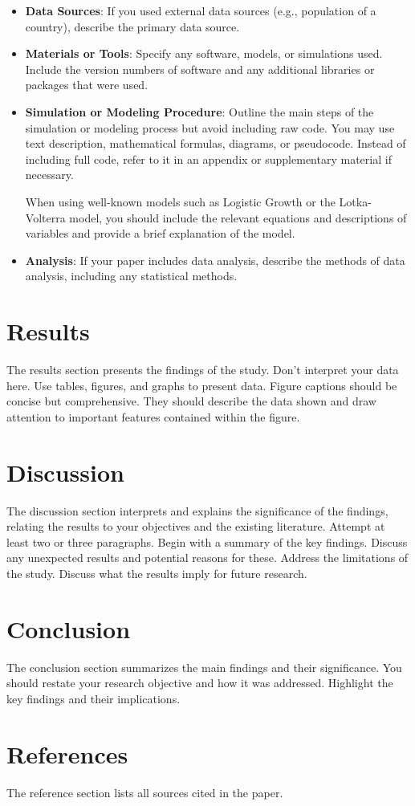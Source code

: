 \documentclass[a4paper,12pt]{article}
\begin{document}
\begin{itemize}
    \item \textbf{Data Sources}: If you used external data sources (e.g., population of a country), describe the primary data source.
    \item \textbf{Materials or Tools}: Specify any software, models, or simulations used. Include the version numbers of software and any additional libraries or packages that were used.
    \item \textbf{Simulation or Modeling Procedure}: Outline the main steps of the simulation or modeling process but avoid including raw code. You may use text description, mathematical formulas, diagrams, or pseudocode. Instead of including full code, refer to it in an appendix or supplementary material if necessary.
    
    When using well-known models such as Logistic Growth or the Lotka-Volterra model, you should include the relevant equations and descriptions of variables and provide a brief explanation of the model.
    \item \textbf{Analysis}: If your paper includes data analysis, describe the methods of data analysis, including any statistical methods.
\end{itemize}

\section{Results}
The results section presents the findings of the study. Don't interpret your data here. Use tables, figures, and graphs to present data. Figure captions should be concise but comprehensive. They should describe the data shown and draw attention to important features contained within the figure.

\section{Discussion}
The discussion section interprets and explains the significance of the findings, relating the results to your objectives and the existing literature. Attempt at least two or three paragraphs. Begin with a summary of the key findings. Discuss any unexpected results and potential reasons for these. Address the limitations of the study. Discuss what the results imply for future research.

\section{Conclusion}
The conclusion section summarizes the main findings and their significance. You should restate your research objective and how it was addressed. Highlight the key findings and their implications.

\section{References}
The reference section lists all sources cited in the paper.

\end{document}
